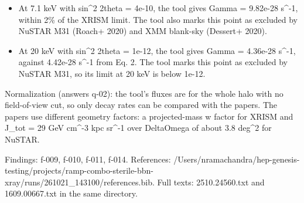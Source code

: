 \documentclass[11pt,a4paper]{article}
\begin{document}
\begin{itemize}
  \item At 7.1 keV with sin\textasciicircum{}2 2theta = 4e-10, the tool gives Gamma = 9.82e-28 s\textasciicircum{}-1, within 2\% of the XRISM limit. The tool also marks this point as excluded by NuSTAR M31 (Roach+ 2020) and XMM blank-sky (Dessert+ 2020).
  \item At 20 keV with sin\textasciicircum{}2 2theta = 1e-12, the tool gives Gamma = 4.36e-28 s\textasciicircum{}-1, against 4.42e-28 s\textasciicircum{}-1 from Eq. 2. The tool marks this point as excluded by NuSTAR M31, so its limit at 20 keV is below 1e-12.
\end{itemize}
Normalization (answers q-02): the tool's fluxes are for the whole halo with no field-of-view cut, so only decay rates can be compared with the papers. The papers use different geometry factors: a projected-mass w factor for XRISM and J\_tot = 29 GeV cm\textasciicircum{}-3 kpc sr\textasciicircum{}-1 over DeltaOmega of about 3.8 deg\textasciicircum{}2 for NuSTAR.

Findings: f-009, f-010, f-011, f-014. References: /Users/nramachandra/hep-genesis-testing/projects/ramp-combo-sterile-bbn-xray/runs/261021\_143100/references.bib. Full texts: 2510.24560.txt and 1609.00667.txt in the same directory.
\end{document}
